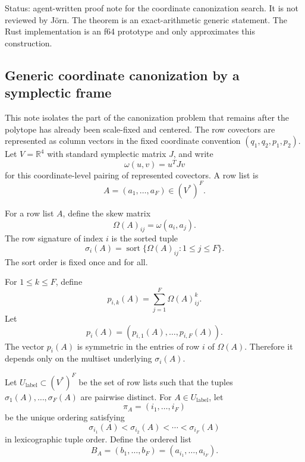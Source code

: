 \begin{unverified}
Status: agent-written proof note for the coordinate canonization search. It is
not reviewed by Jörn. The theorem is an exact-arithmetic generic statement.
The Rust implementation is an f64 prototype and only approximates this
construction.
\end{unverified}

\subsection{Generic coordinate canonization by a symplectic frame}
\label{sec:generic-coordinate-canonization}

This note isolates the part of the canonization problem that remains after the
polytope has already been scale-fixed and centered. The row covectors are
represented as column vectors in the fixed coordinate convention
\((q_1,q_2,p_1,p_2)\). Let \(V=\mathbb R^4\) with standard symplectic matrix
\(J\), and write
\[
  \omega(u,v)=u^T Jv
\]
for this coordinate-level pairing of represented covectors. A row list is
\[
  A=(a_1,\ldots,a_F)\in (V^*)^F.
\]

\begin{definition}
\label{def:omega-row-signatures}
For a row list \(A\), define the skew matrix
\[
  \Omega(A)_{ij}=\omega(a_i,a_j).
\]
The row signature of index \(i\) is the sorted tuple
\[
  \sigma_i(A)=\operatorname{sort}\{\Omega(A)_{ij}:1\le j\le F\}.
\]
The sort order is fixed once and for all.
\end{definition}

\begin{definition}
\label{def:polynomial-omega-row-signatures}
For \(1\le k\le F\), define
\[
  p_{i,k}(A)=\sum_{j=1}^F \Omega(A)_{ij}^k.
\]
Let
\[
  p_i(A)=(p_{i,1}(A),\ldots,p_{i,F}(A)).
\]
The vector \(p_i(A)\) is symmetric in the entries of row \(i\) of
\(\Omega(A)\). Therefore it depends only on the multiset underlying
\(\sigma_i(A)\).
\end{definition}

\begin{definition}
\label{def:generic-row-labeling-domain}
Let \(U_{\mathrm{label}}\subset (V^*)^F\) be the set of row lists such that the
tuples \(\sigma_1(A),\ldots,\sigma_F(A)\) are pairwise distinct. For
\(A\in U_{\mathrm{label}}\), let
\[
  \pi_A=(i_1,\ldots,i_F)
\]
be the unique ordering satisfying
\[
  \sigma_{i_1}(A)<\sigma_{i_2}(A)<\cdots<\sigma_{i_F}(A)
\]
in lexicographic tuple order. Define the ordered list
\[
  B_A=(b_1,\ldots,b_F)=(a_{i_1},\ldots,a_{i_F}).
\]
\end{definition}

